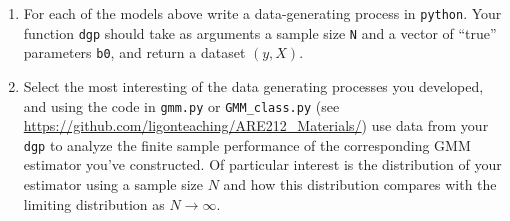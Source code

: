 \documentclass[12pt]{amsart}
\begin{document}
\begin{itemize}
\begin{enumerate}
\item For each of the models above write a data-generating process in \texttt{python}.  Your function
\texttt{dgp} should take as arguments a sample size \texttt{N} and a vector of
``true'' parameters \texttt{b0}, and return a dataset \((y,X)\).
\item Select the most interesting of the data generating processes you
developed, and using the code in \texttt{gmm.py} or \texttt{GMM\_class.py} (see
\url{https://github.com/ligonteaching/ARE212\_Materials/}) use data
from your \texttt{dgp} to analyze the finite sample performance of the
corresponding GMM estimator you've constructed.  Of particular
interest is the distribution of your estimator using a sample
size \(N\) and how this distribution compares with the limiting
distribution as \(N\rightarrow\infty\).
\end{enumerate}
\end{itemize}
\end{document}
